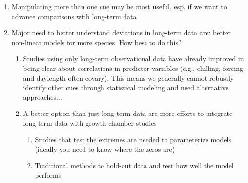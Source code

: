 \documentclass[11pt,letterpaper]{article}
\begin{document}
\begin{enumerate}
\begin{enumerate}
\begin{enumerate}
\end{enumerate}
\item Manipulating more than one cue may be most useful, esp. if we want to advance comparisons with long-term data
\item Major need to better understand deviations in long-term data are: better non-linear models for more species. How best to do this?
\begin{enumerate}
\item Studies using only long-term observational data have already improved in being clear about correlations in predictor variables (e.g., chilling, forcing and daylength often covary). This means we generally cannot robustly identify other cues through statistical modeling and need alternative approaches... %
\item A better option than just long-term data are more efforts to integrate long-term data with growth chamber studies \citep{Caffarra:2011qf,nagano2012,satake2013,ford2016,chuinearees} %
\begin{enumerate}
\item Studies that test the extremes are needed to parameterize models (ideally you need to know where the zeros are) \citep{chuinearees} %
\item Traditional methods to hold-out data and test how well the model performs

\end{enumerate}
\end{enumerate}
\end{enumerate}
\end{enumerate}
\end{document}
